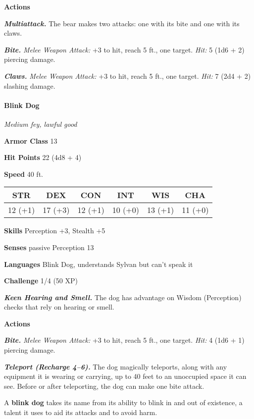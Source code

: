 \documentclass[
]{article}
\begin{document}
\textbf{Actions}

\emph{\textbf{Multiattack.}} The bear makes two attacks: one with its
bite and one with its claws.

\emph{\textbf{Bite.}} \emph{Melee Weapon Attack:} +3 to hit, reach 5
ft., one target. \emph{Hit:} 5 (1d6 + 2) piercing damage.

\emph{\textbf{Claws.}} \emph{Melee Weapon Attack:} +3 to hit, reach 5
ft., one target. \emph{Hit:} 7 (2d4 + 2) slashing damage.

\hypertarget{blink-dog}{%
\paragraph{Blink Dog}\label{blink-dog}}

\emph{Medium fey, lawful good}

\textbf{Armor Class} 13

\textbf{Hit Points} 22 (4d8 + 4)

\textbf{Speed} 40 ft.

\begin{longtable}[]{@{}cccccc@{}}
\toprule
STR & DEX & CON & INT & WIS & CHA\tabularnewline
\midrule
\endhead
12 (+1) & 17 (+3) & 12 (+1) & 10 (+0) & 13 (+1) & 11 (+0)\tabularnewline
\bottomrule
\end{longtable}

\textbf{Skills} Perception +3, Stealth +5

\textbf{Senses} passive Perception 13

\textbf{Languages} Blink Dog, understands Sylvan but can't speak it

\textbf{Challenge} 1/4 (50 XP)

\emph{\textbf{Keen Hearing and Smell.}} The dog has advantage on Wisdom
(Perception) checks that rely on hearing or smell.

\textbf{Actions}

\emph{\textbf{Bite.}} \emph{Melee Weapon Attack:} +3 to hit, reach 5
ft., one target. \emph{Hit:} 4 (1d6 + 1) piercing damage.

\emph{\textbf{Teleport (Recharge 4--6).}} The dog magically teleports,
along with any equipment it is wearing or carrying, up to 40 feet to an
unoccupied space it can see. Before or after teleporting, the dog can
make one bite attack.

A \textbf{blink dog} takes its name from its ability to blink in and out
of existence, a talent it uses to aid its attacks and to avoid harm.
\end{document}
